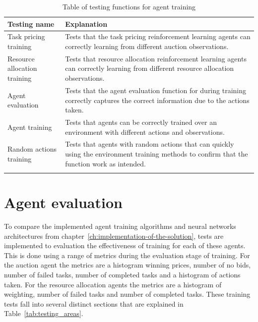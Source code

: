 \begin{longtable}{|p{3cm}|p{11cm}|} \hline
    \textbf{Testing name} & \textbf{Explanation} \\ \hline
    Task pricing training & Tests that the task pricing reinforcement learning agents can correctly learning from
        different auction observations. \\ \hline
    Resource allocation training & Tests that resource allocation reinforcement learning agents can correctly
        learning from different resource allocation observations. \\ \hline
    Agent evaluation & Tests that the agent evaluation function for during training correctly captures the correct
        information due to the actions taken. \\ \hline
    Agent training & Tests that agents can be correctly trained over an environment with different actions and
        observations. \\ \hline
    Random actions training & Tests that agents with random actions that can quickly using the environment training
        methods to confirm that the function work as intended. \\ \hline
    \caption{Table of testing functions for agent training}
    \label{tab:training_testing}
\end{longtable}

\section{Agent evaluation}\label{sec:agent-evaluation}
To compare the implemented agent training algorithms and neural networks architectures from
chapter~\ref{ch:implementation-of-the-solution}, tests are implemented to evaluation the effectiveness of training for
each of these agents. This is done using a range of metrics during the evaluation stage of training. For the
auction agent the metrics are a histogram winning prices, number of no bids, number of failed tasks, number of completed
tasks and a histogram of actions taken. For the resource allocation agents the metrics are a histogram of weighting,
number of failed tasks and number of completed tasks. These training tests fall into several distinct sections that are
explained in Table~\ref{tab:testing_areas}.

